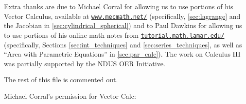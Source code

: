\begin{itemize}
\begin{itemize}
Extra thanks are due
to Michael Corral for allowing us to use portions of his Vector Calculus, available at \texttt{\href{http://www.mecmath.net/}{www.mecmath.net/}}
(specifically, %
\autoref{sec:lagrange} and the Jacobian in \autoref{sec:cylindrical_spherical})
and
to Paul Dawkins for allowing us to use portions of his online math notes from \texttt{\href{http://tutorial.math.lamar.edu/}{tutorial.math.lamar.edu/}} (specifically, Sections \ref{sec:int_techniques} and \ref{sec:series_techniques}, as well as ``Area with Parametric Equations'' in \autoref{sec:par_calc}).
The work on Calculus III was partially supported by the NDUS OER Initiative.

\restoregeometry

\iffalse

The rest of this file is commented out.

Michael Corral's permission for Vector Calc:


\end{itemize}
\end{itemize}
